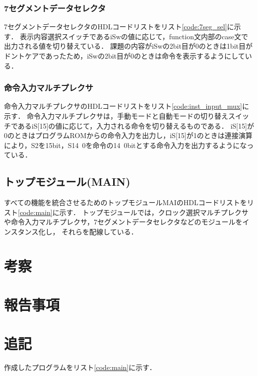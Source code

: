 \documentclass[a4paper,11pt]{ltjsarticle}
\begin{document}
\subsubsection{7セグメントデータセレクタ}
7セグメントデータセレクタのHDLコードリストをリスト\ref{code:7seg_sel}に示す．
表示内容選択スイッチであるiSwの値に応じて，function文内部のcase文で出力される値を切り替えている．
課題の内容がiSwの2bit目が0のときは1bit目がドントケアであったため，iSwの2bit目が0のときは命令を表示するようにしている．
\subsubsection{命令入力マルチプレクサ}
命令入力マルチプレクサのHDLコードリストをリスト\ref{code:inst_input_mux}に示す．
命令入力マルチプレクサは，手動モードと自動モードの切り替えスイッチであるiS[15]の値に応じて，入力される命令を切り替えるものである．
iS[15]が0のときはプログラムROMからの命令入力を出力し，iS[15]が1のときは連接演算により，S2を15bit，S14~0を命令の14~0bitとする命令入力を出力するようになっている．
\subsection{トップモジュール(MAIN)}
すべての機能を統合させるためのトップモジュールMAIのHDLコードリストをリスト\ref{code:main}に示す．
トップモジュールでは，クロック選択マルチプレクサや命令入力マルチプレクサ，7セグメントデータセレクタなどのモジュールをインスタンス化し，
それらを配線している．
\section{考察}
\section{報告事項}
\section{追記}
作成したプログラムをリスト\ref{code:main}に示す．
\end{document}
